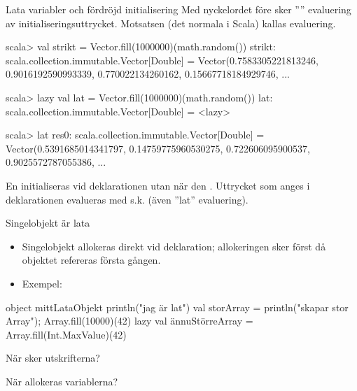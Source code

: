 
\begin{Slide}{Lata variabler och fördröjd initialisering}
Med nyckelordet  före  sker '''' evaluering av initialiseringsuttrycket. Motsatsen (det normala i Scala) kallas  evaluering.
\begin{REPL}
scala> val strikt = Vector.fill(1000000)(math.random())
strikt: scala.collection.immutable.Vector[Double] =
 Vector(0.7583305221813246, 0.9016192590993339, 0.770022134260162, 0.15667718184929746, ...

scala> lazy val lat = Vector.fill(1000000)(math.random())
lat: scala.collection.immutable.Vector[Double] = <lazy>

scala> lat
res0: scala.collection.immutable.Vector[Double] =
  Vector(0.5391685014341797, 0.14759775960530275, 0.722606095900537, 0.9025572787055386, ...
\end{REPL}

En  initialiseras  vid deklarationen utan när den . Uttrycket som anges i deklarationen evalueras med s.k.  (även ''lat'' evaluering).
\end{Slide}




\begin{Slide}{Singelobjekt är lata}

\begin{itemize}
  \item Singelobjekt allokeras  direkt vid deklaration; allokeringen sker först då objektet refereras första gången.

\pause

  \item Exempel:

\end{itemize}

\begin{Code}
object mittLataObjekt {
  println("jag är lat")
  val storArray = { println("skapar stor Array"); Array.fill(10000)(42) }
  lazy val ännuStörreArray = Array.fill(Int.MaxValue)(42)
}
\end{Code}

När sker utskrifterna?

När allokeras variablerna?

\end{Slide}




